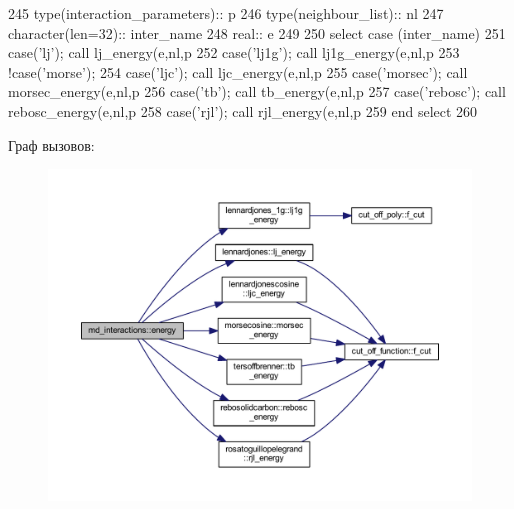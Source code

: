 \begin{DoxyCode}
245     \textcolor{keywordtype}{type}(interaction\_parameters):: p
246     \textcolor{keywordtype}{type}(neighbour\_list):: nl
247     \textcolor{keywordtype}{character(len=32)}:: inter\_name
248     \textcolor{keywordtype}{real}:: e
249     
250     \textcolor{keywordflow}{select case} (inter\_name)
251     \textcolor{keywordflow}{case}(\textcolor{stringliteral}{'lj'});     \textcolor{keyword}{call }lj\_energy(e,nl,p%
252     \textcolor{keywordflow}{case}(\textcolor{stringliteral}{'lj1g'});   \textcolor{keyword}{call }lj1g\_energy(e,nl,p%
253     \textcolor{comment}{!case('morse');}
254     \textcolor{keywordflow}{case}(\textcolor{stringliteral}{'ljc'});    \textcolor{keyword}{call }ljc\_energy(e,nl,p%
255     \textcolor{keywordflow}{case}(\textcolor{stringliteral}{'morsec'}); \textcolor{keyword}{call }morsec\_energy(e,nl,p%
256     \textcolor{keywordflow}{case}(\textcolor{stringliteral}{'tb'});     \textcolor{keyword}{call }tb\_energy(e,nl,p%
257     \textcolor{keywordflow}{case}(\textcolor{stringliteral}{'rebosc'}); \textcolor{keyword}{call }rebosc\_energy(e,nl,p%
258     \textcolor{keywordflow}{case}(\textcolor{stringliteral}{'rjl'});    \textcolor{keyword}{call }rjl\_energy(e,nl,p%
259 \textcolor{keywordflow}{    end select}
260     
\end{DoxyCode}
Граф вызовов\+:\nopagebreak
\begin{figure}[H]
\begin{center}
\leavevmode
\includegraphics[width=350pt]{namespacemd__interactions_a5b3213ff25495c56eeabce8427fb3082_cgraph}
\end{center}
\end{figure}
\mbox{\label{namespacemd__interactions_a5787116d9c766f3d3ec6355c299d58c2}} 
